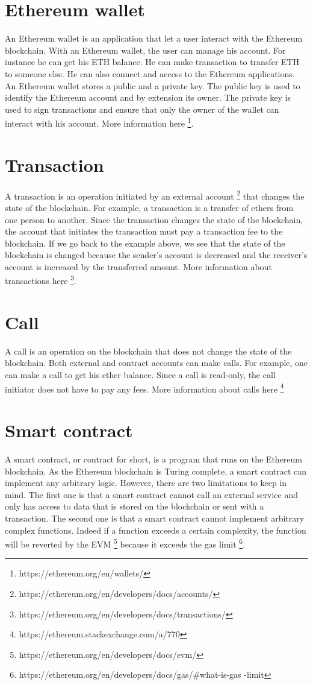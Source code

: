 \documentclass[a4paper,11pt,oneside]{report}
\begin{document}
\section{Ethereum wallet}
An Ethereum wallet is an application that let a user interact with the Ethereum blockchain. With an Ethereum wallet, the user can manage his account. For instance he can get his ETH balance. He can make transaction to transfer ETH to someone else. He can also connect and access to the Ethereum applications. An Ethereum wallet stores a public and a private key. The public key is used to identify the Ethereum account and by extension its owner. The private key is used to sign transactions and ensure that only the owner of the wallet can interact with his account. More information here \footnote{https://ethereum.org/en/wallets/}.

\section{Transaction}
A transaction is an operation initiated by an external account \footnote{https://ethereum.org/en/developers/docs/accounts/} that changes the state of the blockchain. For example, a transaction is a transfer of ethers from one person to another. Since the transaction changes the state of the blockchain, the account that initiates the transaction must pay a transaction fee to the blockchain. If we go back to the example above, we see that the state of the blockchain is changed because the sender's account is decreased and the receiver's account is increased by the transferred amount. More information about transactions here \footnote{https://ethereum.org/en/developers/docs/transactions/}.

\section{Call}
A call is an operation on the blockchain that does not change the state of the blockchain. Both external and contract accounts can make calls. For example, one can make a call to get his ether balance. Since a call is read-only, the call initiator does not have to pay any fees. More information about calls here \footnote{https://ethereum.stackexchange.com/a/770}

\section{Smart contract}
A smart contract, or contract for short, is a program that runs on the Ethereum blockchain. As the Ethereum blockchain is Turing complete, a smart contract can implement any arbitrary logic. However, there are two limitations to keep in mind. The first one is that a smart contract cannot call an external service and only has access to data that is stored on the blockchain or sent with a transaction. The second one is that a smart contract cannot implement arbitrary complex functions. Indeed if a function exceeds a certain complexity, the function will be reverted by the EVM \footnote{https://ethereum.org/en/developers/docs/evm/} because it exceeds the gas limit \footnote{https://ethereum.org/en/developers/docs/gas/#what-is-gas -limit }.
\end{document}
